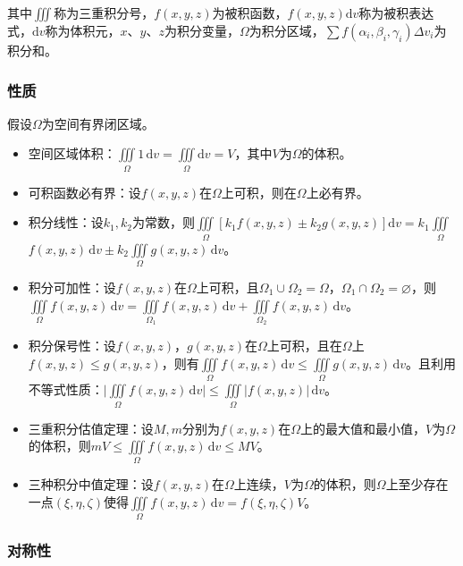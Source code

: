 \documentclass[UTF8, 12pt]{ctexart}
\begin{document}
        其中$\iiint$称为三重积分号，$f(x,y,z)$为被积函数，$f(x,y,z)\textrm{d}v$称为被积表达式，$\textrm{d}v$称为体积元，$x$、$y$、$z$为积分变量，$\Omega$为积分区域，$\sum f(\alpha_i,\beta_i,\gamma_i)\Delta v_i$为积分和。

        \subsubsection{性质}

        假设$\Omega$为空间有界闭区域。

        \begin{itemize}
            \item 空间区域体积：$\iiint\limits_\Omega1\,\textrm{d}v=\iiint\limits_\Omega\textrm{d}v=V$，其中$V$为$\Omega$的体积。
            \item 可积函数必有界：设$f(x,y,z)$在$\Omega$上可积，则在$\Omega$上必有界。
            \item 积分线性：设$k_1,k_2$为常数，则$\iiint\limits_\Omega[k_1f(x,y,z)\pm k_2g(x,y,z)]\textrm{d}v=k_1\iiint\limits_\Omega$\\$f(x,y,z)\,\textrm{d}v\pm k_2\iiint\limits_\Omega g(x,y,z)\,\textrm{d}v$。
            \item 积分可加性：设$f(x,y,z)$在$\Omega$上可积，且$\Omega_1\cup\Omega_2=\Omega$，$\Omega_1\cap\Omega_2=\varnothing$，则$\iiint\limits_\Omega f(x,y,z)\,\textrm{d}v=\iiint\limits_{\Omega_1}f(x,y,z)\,\textrm{d}v+\iiint\limits_{\Omega_2}f(x,y,z)\,\textrm{d}v$。
            \item 积分保号性：设$f(x,y,z)$，$g(x,y,z)$在$\Omega$上可积，且在$\Omega$上$f(x,y,z)\leqslant g(x,y,z)$，则有$\iiint\limits_\Omega f(x,y,z)\,\textrm{d}v\leqslant\iiint\limits_\Omega g(x,y,z)\,\textrm{d}v$。且利用不等式性质：$\vert\iiint\limits_\Omega f(x,y,z)\,\textrm{d}v\vert\leqslant\iiint\limits_\Omega\vert f(x,y,z)\vert\,\textrm{d}v$。
            \item 三重积分估值定理：设$M,m$分别为$f(x,y,z)$在$\Omega$上的最大值和最小值，$V$为$\Omega$的体积，则$mV\leqslant\iiint\limits_\Omega f(x,y,z)\,\textrm{d}v\leqslant MV$。
            \item 三种积分中值定理：设$f(x,y,z)$在$\Omega$上连续，$V$为$\Omega$的体积，则$\Omega$上至少存在一点$(\xi,\eta,\zeta)$使得$\iiint\limits_\Omega f(x,y,z)\,\textrm{d}v=f(\xi,\eta,\zeta)V$。
        \end{itemize}

        \subsubsection{对称性}
\end{document}
